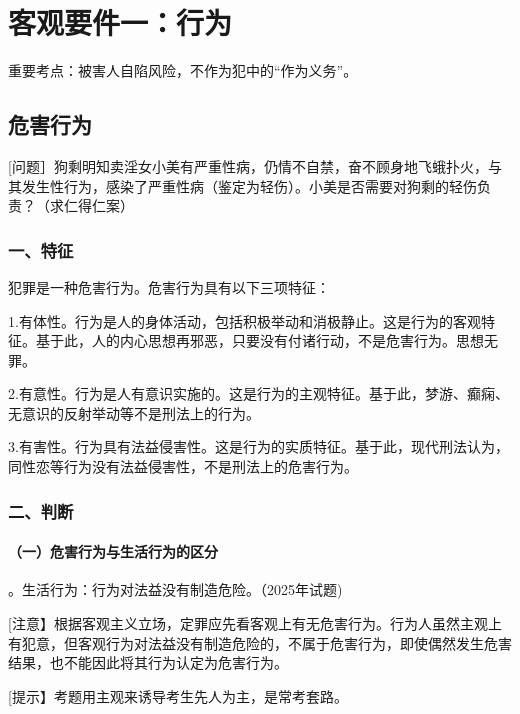\chapter{客观要件一：行为}

\begin{EditionOpeningPanel}
重要考点：被害人自陷风险，不作为犯中的“作为义务”。
\end{EditionOpeningPanel}

\section{危害行为}

[问题］狗剩明知卖淫女小美有严重性病，仍情不自禁，奋不顾身地飞蛾扑火，与其发生性行为，感染了严重性病（鉴定为轻伤）。小美是否需要对狗剩的轻伤负责？（求仁得仁案）

\subsection*{一、特征}

犯罪是一种危害行为。危害行为具有以下三项特征：

1.有体性。行为是人的身体活动，包括积极举动和消极静止。这是行为的客观特征。基于此，人的内心思想再邪恶，只要没有付诸行动，不是危害行为。思想无罪。

2.有意性。行为是人有意识实施的。这是行为的主观特征。基于此，梦游、癫痫、无意识的反射举动等不是刑法上的行为。

3.有害性。行为具有法益侵害性。这是行为的实质特征。基于此，现代刑法认为，同性恋等行为没有法益侵害性，不是刑法上的危害行为。

\subsection*{二、判断}

\subsubsection*{（一）危害行为与生活行为的区分}

。生活行为：行为对法益没有制造危险。（2025年试题)

[注意】根据客观主义立场，定罪应先看客观上有无危害行为。行为人虽然主观上有犯意，但客观行为对法益没有制造危险的，不属于危害行为，即使偶然发生危害结果，也不能因此将其行为认定为危害行为。

[提示】考题用主观来诱导考生先人为主，是常考套路。


